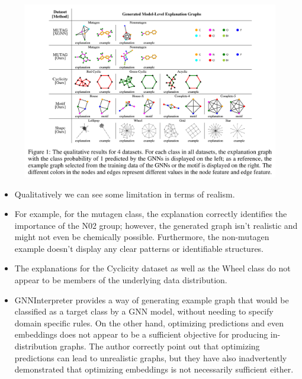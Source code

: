\documentclass[
  11pt,
  letterpaper,
]{article}
\begin{document}
\begin{itemize}
  \begin{figure}

  {\centering \includegraphics{figures/GNNInt_drawn_results.png}

  }

  \end{figure}

  \begin{itemize}
  \item
    Qualitatively we can see some limitation in terms of realism.
  \item
    For example, for the mutagen class, the explanation correctly
    identifies the importance of the N02 group; however, the generated
    graph isn't realistic and might not even be chemically possible.
    Furthermore, the non-mutagen example doesn't display any clear
    patterns or identifiable structures.
  \item
    The explanations for the Cyclicity dataset as well as the Wheel
    class do not appear to be members of the underlying data
    distribution.
  \item
    GNNInterpreter provides a way of generating example graph that would
    be classified as a target class by a GNN model, without needing to
    specify domain specific rules. On the other hand, optimizing
    predictions and even embeddings does not appear to be a sufficient
    objective for producing in-distribution graphs. The author correctly
    point out that optimizing predictions can lead to unrealistic
    graphs, but they have also inadvertently demonstrated that
    optimizing embeddings is not necessarily sufficient either.
  \end{itemize}
\end{itemize}
\end{document}
